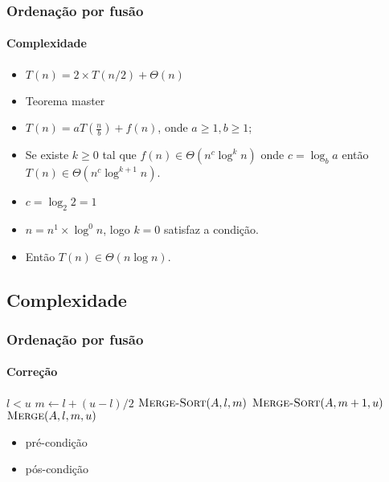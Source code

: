 \documentclass{beamer}
\begin{document}
\begin{frame}

  \frametitle{Ordenação por fusão}
  \framesubtitle{Complexidade}

  \begin{itemize}
  \item $T(n) = 2 \times T(n / 2) + \Theta(n)$ \pause
  \item Teorema master \pause
  \item $T(n) = a T(\frac{n}{b}) + f(n)$, onde $a \ge 1, b \ge 1$;
  \item Se existe $k \ge 0$ tal que $f(n) \in \Theta(n^{c} \log^{k} n)$ onde $c = \log_b a$ então $T(n) \in \Theta(n^{c} \log^{k+1} n)$. \pause
  \item $c = \log_2 2 = 1$ \pause
  \item $n = n^1 \times \log^0 n$, logo $k = 0$ satisfaz a condição.\pause
  \item Então $T(n) \in \Theta(n \log n)$.
  \end{itemize}

\end{frame}

\subsection{Complexidade}

\begin{frame}

  \frametitle{Ordenação por fusão}
  \framesubtitle{Correção}

\begin{codebox}
\li \If $l < u$
\li \Then $m \gets l + (u - l) / 2$
\li    $\textnormal{\scshape Merge-Sort}(A, l, m)$
\li    $\textnormal{\scshape Merge-Sort}(A, m+1, u)$
\li    $\textnormal{\scshape Merge}(A, l, m, u)$
\zi \End
\end{codebox}  

    \begin{itemize}
    \item pré-condição
    \item pós-condição
    \end{itemize}

\end{frame}
\end{document}
